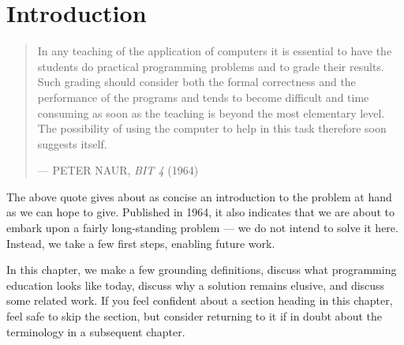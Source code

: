 
\chapter{Introduction}

\begin{quotation}

\footnotesize\sffamily\itshape

\begin{flushright}

In any teaching of the application of computers it is essential to have the
students do practical programming problems and to grade their results. Such
grading should consider both the formal correctness and the performance of the
programs and tends to become difficult and time consuming as soon as the
teaching is beyond the most elementary level.  The possibility of using the
computer to help in this task therefore soon suggests itself.

\smallbreak

\upshape

--- PETER NAUR, {\itshape BIT 4} (1964)

\end{flushright}

\end{quotation}

The above quote gives about as concise an introduction to the problem at hand
as we can hope to give. Published in 1964, it also indicates that we are about
to embark upon a fairly long-standing problem --- we do not intend to solve it
here. Instead, we take a few first steps, enabling future work.

In this chapter, we make a few grounding definitions, discuss what programming
education looks like today, discuss why a solution remains elusive, and discuss
some related work. If you feel confident about a section heading in this
chapter, feel safe to skip the section, but consider returning to it if in
doubt about the terminology in a subsequent chapter.










